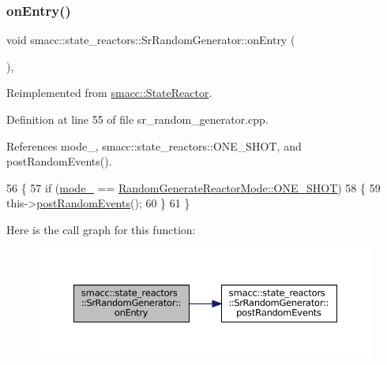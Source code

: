 \subsubsection{\texorpdfstring{on\+Entry()}{onEntry()}}
{\footnotesize\ttfamily void smacc\+::state\+\_\+reactors\+::\+Sr\+Random\+Generator\+::on\+Entry (\begin{DoxyParamCaption}{ }\end{DoxyParamCaption})\hspace{0.3cm}{\ttfamily [override]}, {\ttfamily [virtual]}}



Reimplemented from \hyperlink{classsmacc_1_1StateReactor_a11ed02721fd751b8272540645b88f4a6}{smacc\+::\+State\+Reactor}.



Definition at line 55 of file sr\+\_\+random\+\_\+generator.\+cpp.



References mode\+\_\+, smacc\+::state\+\_\+reactors\+::\+O\+N\+E\+\_\+\+S\+H\+OT, and post\+Random\+Events().


\begin{DoxyCode}
56 \{
57     \textcolor{keywordflow}{if} (\hyperlink{classsmacc_1_1state__reactors_1_1SrRandomGenerator_a10984da2fb51badf4fe6f25861120735}{mode\_} == \hyperlink{namespacesmacc_1_1state__reactors_a038f8e362ad6d35494c940ee4c97a52ea5bc2964599423c796ecf0aaecdc5be9d}{RandomGenerateReactorMode::ONE\_SHOT})
58     \{
59         this->\hyperlink{classsmacc_1_1state__reactors_1_1SrRandomGenerator_a50638c93ca9444fbeecea6e72bc6ac35}{postRandomEvents}();
60     \}
61 \}
\end{DoxyCode}
Here is the call graph for this function\+:
\nopagebreak
\begin{figure}[H]
\begin{center}
\leavevmode
\includegraphics[width=350pt]{classsmacc_1_1state__reactors_1_1SrRandomGenerator_a093fa3de1ca4f84c74cc0cb0f093cb31_cgraph}
\end{center}
\end{figure}
\mbox{\label{classsmacc_1_1state__reactors_1_1SrRandomGenerator_a8635347245b76d17355fe374e854144f}} 
